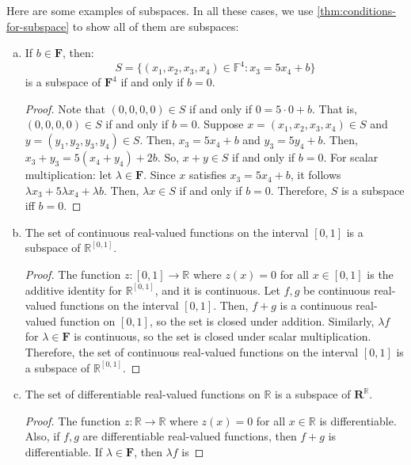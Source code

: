 \documentclass{article}
\begin{document}
Here are some examples of subspaces. In all these cases, we use
\cref{thm:conditions-for-subspace} to show all of them are subspaces:

\begin{example}
  \leavevmode
  \begin{enumerate}[(a)]
  \item If $b \in \mathbf{F}$, then:
    $$S = \{(x_1, x_2, x_3, x_4) \in \mathbb{F}^4: x_3 = 5x_4 + b\}$$
    is a subspace of $\mathbf{F}^4$ if and only if $b = 0$.
    \begin{proof}
      Note that $(0,0,0,0) \in S$ if and only if $0 = 5 \cdot 0 +
      b$. That is, $(0,0,0,0) \in S$ if and only if $b = 0$. Suppose
      $x = (x_1, x_2, x_3, x_4) \in S$ and $y = (y_1, y_2, y_3, y_4)
      \in S$. Then, $x_3 = 5x_4 + b$ and $y_3  = 5y_4 + b$. Then, $x_3
      + y_3 = 5(x_4 + y_4) + 2b$. So, $x + y \in S$ if and only if $b =
      0$. For scalar multiplication: let $\lambda \in
      \mathbf{F}$. Since $x$ satisfies $x_3 = 5x_4 + b$, it follows
      $\lambda x_3 + 5 \lambda x_4 + \lambda b$. Then, $\lambda x \in
      S$ if and only if $b = 0$. Therefore, $S$ is a subspace iff $b =
      0$.
    \end{proof}
  \item
    The set of continuous real-valued functions on the interval $[0,
    1]$ is a subspace of $\mathbb{R}^{[0, 1]}$.
    \begin{proof}
      The function $z: [0, 1] \rightarrow \mathbb{R}$ where $z(x) = 0$ for all
      $x \in [0, 1]$ is the additive identity for $\mathbb{R}^{[0,
        1]}$, and it is continuous. Let $f, g$ be continuous
      real-valued functions on the interval $[0, 1]$. Then, $f + g$ is
      a continuous real-valued function on $[0, 1]$, so the set is
      closed under addition. Similarly, $\lambda f$ for $\lambda \in
      \mathbf{F}$ is continuous, so the set is closed under scalar
      multiplication. Therefore, the set of continuous real-valued
      functions on the interval $[0, 1]$ is a subspace of $\mathbb{R}^{[0,1]}$.
    \end{proof}
  \item
    The set of differentiable real-valued functions on $\mathbb{R}$ is
    a subspace of $\mathbf{R}^{\mathbb{R}}$.
    \begin{proof}
      The function $z: \mathbb{R} \rightarrow \mathbb{R}$ where $z(x)
      = 0$ for all $x \in \mathbb{R}$ is differentiable. Also, if $f,
      g$ are differentiable real-valued functions, then $f + g$ is
      differentiable. If $\lambda \in \mathbf{F}$, then $\lambda f$ is

\end{proof}
\end{enumerate}
\end{example}
\end{document}

